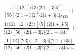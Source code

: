 \documentclass[varwidth, border=5pt]{standalone}
\begin{document}
\begin{my}
$\begin{gathered}
\scriptscriptstyle\frac{-1[12]^2⟨13⟩⟨2|1+3|5]^2}{[56]⟨2|1+3|2]^2⟨2|1+3|4]s_{123}}+\\
\scriptscriptstyle\frac{1⟨12⟩[12]⟨23⟩[45]⟨2|1+3|5]}{⟨12⟩[56]⟨2|1+3|2]⟨2|1+3|4]^2}+\\
\scriptscriptstyle\frac{1[12]⟨23⟩⟨1|2+3|5]⟨2|1+3|5]}{⟨12⟩[56]⟨2|1+3|2]⟨2|1+3|4]s_{123}}\phantom{+}
\end{gathered}$
\end{my}
\end{document}
